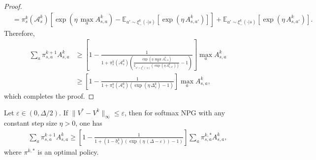 \begin{proof}
\begin{align*}
&=\pi_s^k(\mathcal{A}_s^k)\left[\exp\left(\eta\,\max_aA^k_{s,a}\right)-\mathbb{E}_{a'\sim \xi^k_-(\cdot|s)}\left[\exp\left(\eta\,A^k_{s,a'}\right)\right]\right]+\mathbb{E}_{a'\sim \xi^k_-(\cdot|s)}\left[\exp\left(\eta\,A^k_{s,a'}\right)\right].
\end{align*}
Therefore, 
\begin{align*}
\sum_a\pi^{k+1}_{s,a} A^k_{s,a}&\geq \left[1-\frac{1}{1+\pi_s^k(\mathcal{A}_s^k)\left(\frac{\exp\left(\eta\,\max_a A^k_{s,a}\right)}{\mathbb{E}_{a'\sim \xi^k_-(\cdot|s)}\left(\exp\left(\eta\,A^k_{s,a'}\right)\right)}-1\right)}\right]\max_a A^k_{s,a}\\
&\geq \left[1-\frac{1}{1+\pi_s^k(\mathcal{A}_s^k)\left(\exp\left(\eta\,\Delta_s^k\right)-1\right)}\right]\max_a A^k_{s,a},
\end{align*}
which completes the proof.
\end{proof}
\begin{lemma}\label{lem:softmaxNPG-improvement-lower02}
    Let $\varepsilon \in(0,\Delta/2)$. If $\|V^*-V^k\|_\infty\leq \varepsilon$, then for softmax NPG with any constant step size $\eta>0$, one has
\begin{align*}
\sum_a\pi^{k+1}_{s,a}A^k_{s,a}\geq \left[1-\frac{1}{1+(1-b_s^k)\left(\exp(\eta\,(\Delta-\varepsilon))-1\right)}\right]\sum_a\pi^{k,*}_{s,a}A^k_{s,a},
\end{align*}
{where $\pi^{k,*}$ is an optimal policy.}
\end{lemma}
